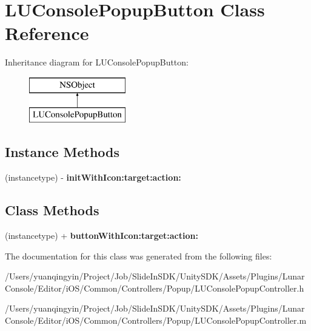 \hypertarget{interface_l_u_console_popup_button}{}\section{L\+U\+Console\+Popup\+Button Class Reference}
\label{interface_l_u_console_popup_button}
Inheritance diagram for L\+U\+Console\+Popup\+Button\+:\begin{figure}[H]
\begin{center}
\leavevmode
\includegraphics[height=2.000000cm]{interface_l_u_console_popup_button}
\end{center}
\end{figure}
\subsection*{Instance Methods}
\begin{DoxyCompactItemize}
\item 
\mbox{\label{interface_l_u_console_popup_button_a6dabba78eb071b31a8f7a8efdf76fb4b}} 
(instancetype) -\/ {\bfseries init\+With\+Icon\+:target\+:action\+:}
\end{DoxyCompactItemize}
\subsection*{Class Methods}
\begin{DoxyCompactItemize}
\item 
\mbox{\label{interface_l_u_console_popup_button_acf6b7a4e44c1b0a6f32e7a6035d1e674}} 
(instancetype) + {\bfseries button\+With\+Icon\+:target\+:action\+:}
\end{DoxyCompactItemize}


The documentation for this class was generated from the following files\+:\begin{DoxyCompactItemize}
\item 
/\+Users/yuanqingyin/\+Project/\+Job/\+Slide\+In\+S\+D\+K/\+Unity\+S\+D\+K/\+Assets/\+Plugins/\+Lunar\+Console/\+Editor/i\+O\+S/\+Common/\+Controllers/\+Popup/L\+U\+Console\+Popup\+Controller.\+h\item 
/\+Users/yuanqingyin/\+Project/\+Job/\+Slide\+In\+S\+D\+K/\+Unity\+S\+D\+K/\+Assets/\+Plugins/\+Lunar\+Console/\+Editor/i\+O\+S/\+Common/\+Controllers/\+Popup/L\+U\+Console\+Popup\+Controller.\+m\end{DoxyCompactItemize}
